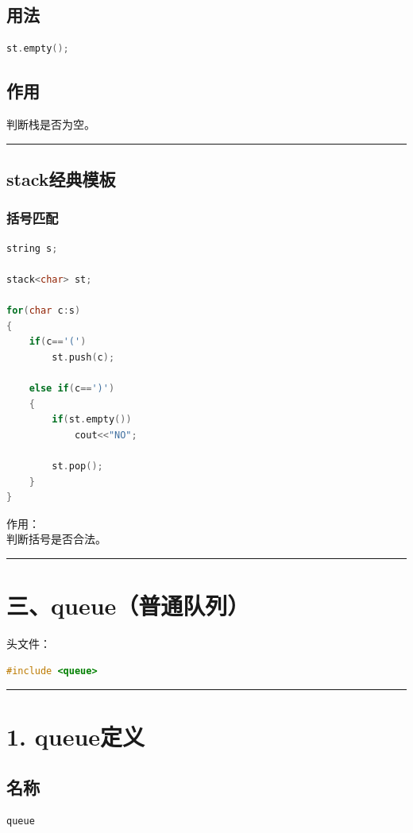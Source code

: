 \documentclass[10pt,twocolumn]{extarticle}
\begin{document}
\subsection{用法}
\begin{lstlisting}[language=C++]
st.empty();
\end{lstlisting}

\subsection{作用}
判断栈是否为空。

\noindent\rule{\linewidth}{0.4pt}

\subsection{stack经典模板}

\subsubsection{括号匹配}
\begin{lstlisting}[language=C++]
string s;

stack<char> st;

for(char c:s)
{
    if(c=='(')
        st.push(c);

    else if(c==')')
    {
        if(st.empty())
            cout<<"NO";

        st.pop();
    }
}
\end{lstlisting}
作用：\\
判断括号是否合法。

\noindent\rule{\linewidth}{0.4pt}

\section{三、queue（普通队列）}

头文件：
\begin{lstlisting}[language=C++]
#include <queue>
\end{lstlisting}

\noindent\rule{\linewidth}{0.4pt}

\section{1. queue定义}

\subsection{名称}
\begin{lstlisting}[language=C++]
queue
\end{lstlisting}
\end{document}
